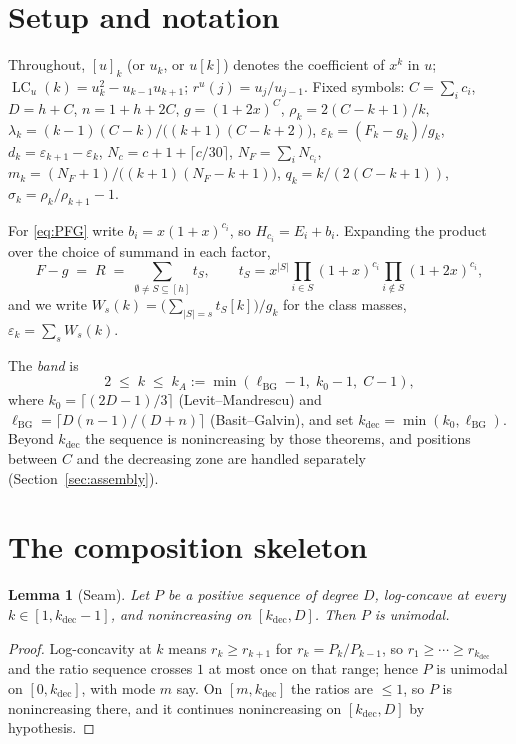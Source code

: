 \documentclass[11pt]{article}
\newtheorem{lemma}[theorem]{Lemma}
\theoremstyle{definition}
\newcommand{\eps}{\varepsilon}
\DeclareMathOperator{\lc}{LC}
\begin{document}
\section{Setup and notation}\label{sec:setup}

Throughout, $[u]_k$ (or $u_k$, or $u[k]$) denotes the coefficient of
$x^k$ in $u$; $\lc_u(k)=u_k^2-u_{k-1}u_{k+1}$; $r^u(j)=u_j/u_{j-1}$.
Fixed symbols: $C=\sum_ic_i$, $D=h+C$, $n=1+h+2C$,
$g=(1+2x)^C$, $\rho_k=2(C-k+1)/k$,
$\lambda_k=(k-1)(C-k)/\bigl((k+1)(C-k+2)\bigr)$,
$\eps_k=(F_k-g_k)/g_k$, $d_k=\eps_{k+1}-\eps_k$,
$N_c=c+1+\lceil c/30\rceil$, $N_F=\sum_iN_{c_i}$,
$m_k=(N_F+1)/\bigl((k+1)(N_F-k+1)\bigr)$,
$q_k=k/(2(C-k+1))$, $\sigma_k=\rho_k/\rho_{k+1}-1$.

For \eqref{eq:PFG} write $b_i=x(1+x)^{c_i}$, so $H_{c_i}=E_i+b_i$.
Expanding the product over the choice of summand in each factor,
\[
  F-g \;=\; R\;=\;\sum_{\emptyset\ne S\subseteq[h]} t_S,\qquad
  t_S=x^{|S|}\prod_{i\in S}(1+x)^{c_i}\prod_{i\notin S}(1+2x)^{c_i},
\]
and we write $W_s(k)=\bigl(\sum_{|S|=s}t_S[k]\bigr)/g_k$ for the class
masses, $\eps_k=\sum_s W_s(k)$.

The \emph{band} is
\begin{equation}\label{eq:band}
  2\;\le\;k\;\le\;k_A:=\min(\ell_{\mathrm{BG}}-1,\;k_0-1,\;C-1),
\end{equation}
where $k_0=\lceil(2D-1)/3\rceil$ (Levit--Mandrescu) and
$\ell_{\mathrm{BG}}=\lceil D(n-1)/(D+n)\rceil$ (Basit--Galvin), and set
$k_{\mathrm{dec}}=\min(k_0,\ell_{\mathrm{BG}})$.  Beyond
$k_{\mathrm{dec}}$ the sequence is nonincreasing by those theorems, and
positions between $C$ and the decreasing zone are handled separately
(Section~\ref{sec:assembly}).

\section{The composition skeleton}\label{sec:skeleton}

\begin{lemma}[Seam]\label{lem:seam}
Let $P$ be a positive sequence of degree $D$, log-concave at every
$k\in[1,k_{\mathrm{dec}}-1]$, and nonincreasing on
$[k_{\mathrm{dec}},D]$.  Then $P$ is unimodal.
\end{lemma}

\begin{proof}
Log-concavity at $k$ means $r_k\ge r_{k+1}$ for $r_k=P_k/P_{k-1}$, so
$r_1\ge\cdots\ge r_{k_{\mathrm{dec}}}$ and the ratio sequence crosses
$1$ at most once on that range; hence $P$ is unimodal on
$[0,k_{\mathrm{dec}}]$, with mode $m$ say.  On $[m,k_{\mathrm{dec}}]$
the ratios are $\le1$, so $P$ is nonincreasing there, and it continues
nonincreasing on $[k_{\mathrm{dec}},D]$ by hypothesis.
\end{proof}
\end{document}
